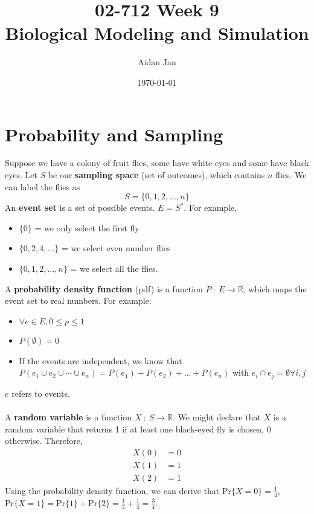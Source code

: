 \documentclass[10pt]{article}
\title{02-712 Week 9 \\ \large{Biological Modeling and Simulation}}
\author{Aidan Jan}
\date{\today}
\newcommand{\pr}{\text{Pr}}
\begin{document}
\maketitle

\section*{Probability and Sampling}
Suppose we have a colony of fruit flies, some have white eyes and some have black eyes.  Let $S$ be our \textbf{sampling space} (set of outcomes), which contains $n$ flies.  We can label the flies as
\[S = \{0, 1, 2, \dots, n\}\]
An \textbf{event set} is a set of possible events.  $E = S^*$.  For example,
\begin{itemize}
	\item $\{0\}$ = we only select the first fly
	\item $\{0, 2, 4, \dots\}$ = we select even number flies
	\item $\{0, 1, 2, \dots, n\}$ = we select all the flies.
\end{itemize}
A \textbf{probability density function} (pdf) is a function $P \::\: E \rightarrow \mathbb{R}$, which maps the event set to real numbers.  For example:
\begin{itemize}
	\item $\forall e \in E, 0 \leq p \leq 1$
	\item $P(\emptyset) = 0$
	\item If the events are independent, we know that $P(e_1 \cup e_2 \cup \cdots \cup e_n) = P(e_1) + P(e_2) + \dots + P(e_n)$ with $e_i \cap e_j = \emptyset \forall i, j$
\end{itemize}
$e$ refers to events.\\\\
A \textbf{random variable} is a function $X \::\: S \rightarrow \mathbb{R}$.  We might declare that $X$ is a random variable that returns 1 if at least one black-eyed fly is chosen, 0 otherwise.
Therefore,
\begin{align*}
    X(0) &= 0 \\
    X(1) &= 1 \\
    X(2) &= 1
\end{align*}
Using the probability density function, we can derive that $\pr\{X = 0\} = \frac{1}{4}$, $\pr\{X = 1\} = \pr\{1\} + \pr\{2\} = \frac{1}{2} + \frac{1}{4} = \frac{3}{4}$.
\end{document}
